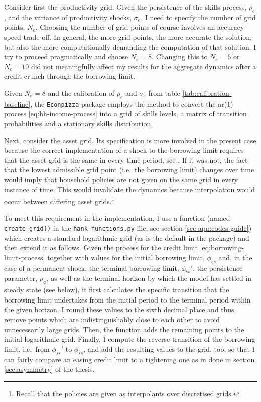 \documentclass[a4paper,12pt]{article} %
\numberwithin{equation}{section} %
\numberwithin{figure}{section}
\numberwithin{table}{section}
\begin{document}
\begin{refsection}
\begin{appendices}
Consider first the productivity grid. Given the persistence of the skills process, $\rho_e$, and the variance of productivity shocks, $\sigma_e$, I need to specify the number of grid points, $N_e$. Choosing the number of grid points of course involves an accuracy-speed trade-off. In general, the more grid points, the more accurate the solution, but also the more computationally demanding the computation of that solution. I try to proceed pragmatically and choose $N_e = 8$. Changing this to $N_e=6$ or $N_e=10$ did not meaningfully affect my results for the aggregate dynamics after a credit crunch through the borrowing limit. 

Given $N_e = 8$ and the calibration of $\rho_e$ and $\sigma_e$ from table \ref{tab:calibration-baseline}, the \texttt{Econpizza} package employs the \textcite{rouwenhorst1995} method to convert the \Gls{ar}(1) process \eqref{eq:hh-income-process} into a grid of skills levels, a matrix of transition probabilities and a stationary skills distribution.

Next, consider the asset grid. Its specification is more involved in the present case because the correct implementation of a shock to the borrowing limit requires that the asset grid is the same in every time period, see \textcite{mellior2016mimeo}. If it was not, the fact that the lowest admissible grid point (i.e.~the borrowing limit) changes over time would imply that household policies are not given on the same grid in every instance of time. This would invalidate the dynamics because interpolation would occur between differing asset grids.\footnote{Recall that the policies are given as interpolants over discretised grids.}

To meet this requirement in the implementation, I use a function (named \texttt{create\_grid()} in the \texttt{hank\_functions.py} file, see section \ref{sec-app:codes-guide}) which creates a standard logarithmic grid (as is the default in the package) and then extend it as follows. Given the process for the credit limit \eqref{eq:borrowing-limit-process} together with values for the initial borrowing limit, $\phi_{ss}$ and, in the case of a permanent shock, the terminal borrowing limit, $\phi_{ss}'$, the persistence parameter, $\rho_{\phi}$, as well as the terminal horizon by which the model has settled in steady state (see below), it first calculates the specific transition that the borrowing limit undertakes from the initial period to the terminal period within the given horizon. I round these values to the sixth decimal place and thus remove points which are indistinguishably close to each other to avoid unnecessarily large grids. Then, the function adds the remaining points to the initial logarithmic grid. Finally, I compute the reverse transition of the borrowing limit, i.e.~from $\phi_{ss}'$ to $\phi_{ss}$, and add the resulting values to the grid, too, so that I can fairly compare an easing credit limit to a tightening one as in done in section \ref{sec:asymmetry} of the thesis.


\end{appendices}
\end{refsection}
\end{document}
